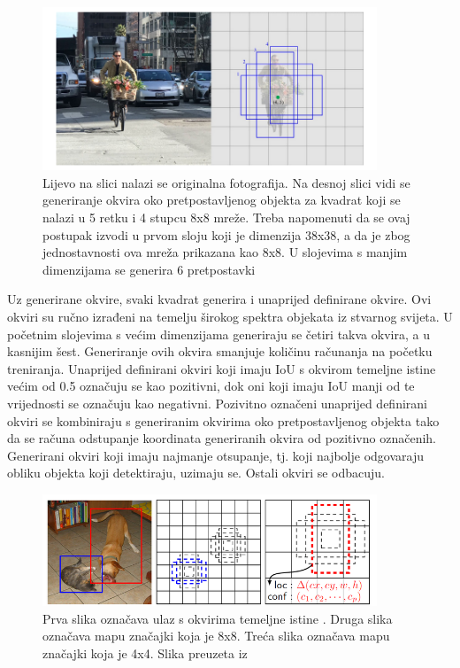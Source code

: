 \begin{figure}[htb]
    \centering
    \includegraphics[width=10cm]{img/SSD-okviri.png}
    \caption{Lijevo na slici nalazi se originalna fotografija. Na desnoj slici vidi se generiranje okvira oko pretpostavljenog objekta za kvadrat koji se 
    nalazi u 5 retku i 4 stupcu 8x8 mreže. Treba napomenuti da se ovaj postupak izvodi u prvom sloju koji je dimenzija 38x38, a da je zbog jednostavnosti 
    ova mreža prikazana kao 8x8. U slojevima s manjim dimenzijama se generira 6 pretpostavki}
    \label{SSD okvir}
\end{figure}

Uz generirane okvire, svaki kvadrat generira i unaprijed definirane okvire. Ovi okviri su ručno izrađeni na temelju širokog spektra objekata iz stvarnog svijeta.
U početnim slojevima s većim dimenzijama generiraju se četiri takva okvira, a u kasnijim šest. Generiranje ovih okvira smanjuje količinu računanja na početku treniranja. 
Unaprijed definirani okviri koji imaju IoU s okvirom temeljne istine većim od 0.5 označuju se kao pozitivni, dok oni koji imaju IoU manji od te vrijednosti se označuju kao negativni.
Pozivitno označeni unaprijed definirani okviri se kombiniraju s generiranim okvirima oko pretpostavljenog objekta tako da se računa odstupanje koordinata generiranih okvira od pozitivno
označenih. Generirani okviri koji imaju najmanje otsupanje, tj. koji najbolje odgovaraju obliku objekta koji detektiraju, uzimaju se. Ostali okviri se odbacuju. 





\begin{figure}[h!]
    \centering
    \includegraphics[width=10cm]{img/SSD.png}
    \caption{Prva slika označava ulaz s okvirima temeljne istine . Druga slika označava mapu značajki koja je 8x8. Treća slika označava mapu značajki koja je 4x4. Slika preuzeta iz \citep{DBLP:journals/corr/LiuAESR15}}
    \label{SSD model}
\end{figure}

